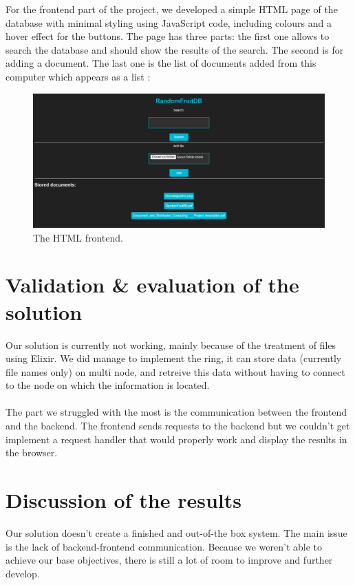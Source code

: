 \documentclass{article}
\begin{document}
For the frontend part of the project, we developed a simple HTML page of the database with minimal styling using JavaScript code, including colours and a hover effect for the buttons. 
The page has three parts: the first one allows to search the database and should show the results of the search. The second is for adding a document. The last one is the list of documents added from this computer which appears as a list :

\begin{figure}[!htbp]
  \centering
  \includegraphics[width=\textwidth]{img/html.png}
  \caption{The HTML frontend.}
  \label{figure 3 :}
\end{figure}


\section{Validation \& evaluation of the solution}

Our solution is currently not working, mainly because of the treatment of files using Elixir. We did manage to implement the ring, it can store data (currently file names only) on multi node, and retreive this data without having to connect to the node on which the information is located. 
\\\\
The part we struggled with the most is the communication between the frontend and the backend. The frontend sends requests to the backend but we couldn't get implement a request handler that would properly work and display the results in the browser.


\section{Discussion of the results}

Our solution doesn't create a finished and out-of-the box system. The main issue is the lack of backend-frontend communication. Because we weren't able to achieve our base objectives, there is still a lot of room to improve and further develop.
\end{document}
